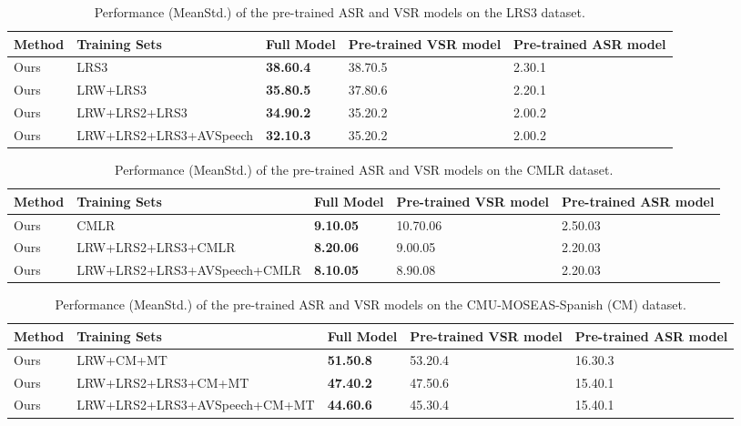 \documentclass[twocolumn]{article}
\begin{document}
 \begin{table*}[!t]
\renewcommand\arraystretch{1.0}
\caption{Performance (MeanStd.) of the pre-trained ASR and VSR models on the LRS3 dataset.}
\begin{tabularx}{2\columnwidth}{f q y y y }
\toprule
Method &Training Sets & Full Model  &Pre-trained VSR model  &Pre-trained ASR model \\
\midrule\midrule
Ours &LRS3 &\bf 38.60.4 &38.70.5 &2.30.1  \\
\midrule
Ours &LRW+LRS3&\bf 35.80.5 &37.80.6 &2.20.1 \\
\midrule
Ours &LRW+LRS2+LRS3&\bf 34.90.2 &35.20.2 &2.00.2 \\
\midrule
Ours &LRW+LRS2+LRS3+AVSpeech &\bf 32.10.3 &35.20.2 &2.00.2 \\
\midrule
\end{tabularx}
\label{table: supplemental_results_on_LRS3}
\end{table*} \begin{table*}[!t]
\centering
\caption{Performance (MeanStd.) of the pre-trained ASR and VSR models on the CMLR dataset.}
\renewcommand\arraystretch{1.0}
\begin{tabularx}{2\columnwidth}{f q y y y }
\toprule
Method &Training Sets & Full Model  &Pre-trained VSR model  &Pre-trained ASR model \\
\midrule
Ours &CMLR &\bf 9.10.05 &10.70.06 & 2.50.03  \\
\midrule
Ours &LRW+LRS2+LRS3+CMLR &\bf 8.20.06 & 9.00.05 & 2.20.03 \\
\midrule
Ours &LRW+LRS2+LRS3+AVSpeech+CMLR &\bf 8.10.05 &8.90.08 & 2.20.03 \\
\bottomrule
\end{tabularx}
\label{tab: supplemental_cmlr_results}
\end{table*} \begin{table*}[!t]
\centering
\caption{Performance (MeanStd.) of the pre-trained ASR and VSR models on the CMU-MOSEAS-Spanish (CM) dataset.
}
\renewcommand\arraystretch{1.0}
\begin{tabularx}{2\columnwidth}{f q y y y }
\toprule
Method &Training Sets & Full Model  &Pre-trained VSR model  &Pre-trained ASR model \\
\midrule
Ours &LRW+CM+MT &\bf 51.50.8 &53.20.4 &16.30.3 \\
\midrule
Ours &LRW+LRS2+LRS3+CM+MT &\bf 47.40.2 &47.50.6 &15.40.1 \\ \midrule
Ours &LRW+LRS2+LRS3+AVSpeech+CM+MT &\bf 44.60.6 & 45.30.4 & 15.40.1 \\

\end{tabularx}
\end{table*}
\end{document}
